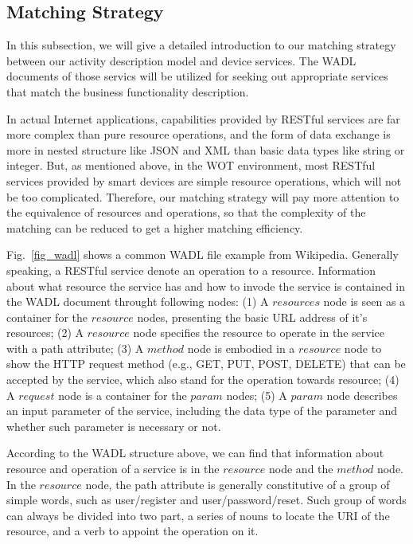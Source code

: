 \subsection{Matching Strategy}
In this subsection, we will give a detailed introduction to our matching strategy between our activity description model and device services. The WADL documents of those servics will be 
utilized for seeking out appropriate services that match the business functionality description. 

In actual Internet applications, capabilities provided by RESTful services are far more complex than pure resource operations, and the form of data exchange is more in nested structure like JSON and XML than basic data types like string or integer. But, as mentioned above, in the WOT environment, most RESTful services provided by smart devices are simple  resource operations, which will not be too complicated. Therefore, our matching strategy will pay more attention to the  equivalence of resources and operations, so that the complexity of the matching can be reduced to get a higher matching efficiency. 

Fig.~\ref{fig_wadl} shows a common WADL file example from Wikipedia. Generally speaking, a RESTful service denote an operation to a resource. Information about what resource the service has and how to invode the service is contained in the WADL document throught following nodes: (1) A $resources$ node is seen as a container for the $resource$ nodes, presenting the basic URL address of it's resources; (2) A $resource$ node specifies the resource to operate in the service with a path attribute; (3) A $method$ node is embodied in a $resource$ node to show the HTTP request method (e.g., GET, PUT, POST, DELETE) that can be accepted by the service, which also stand for the operation towards resource; (4) A $request$ node is a container for the $param$ nodes; (5) A $param$ node describes an input parameter of the service, including the data type of the parameter and whether such parameter is necessary or not. 

According to the WADL structure above, we can find that information about resource and operation of a service is in the $resource$ node and the $method$ node. In the $resource$ node, the path attribute is generally constitutive of a group of simple words, such as user/register and user/password/reset. Such group of words can always be divided into two part, a series of nouns to locate the URI of the resource, and a verb to appoint the operation on it. 

